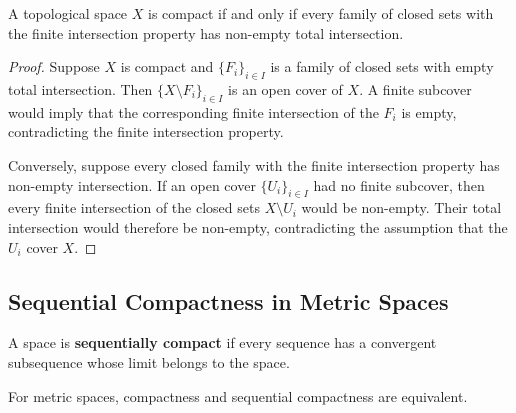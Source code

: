 \begin{theorem}
A topological space $X$ is compact if and only if every family of closed sets with the finite intersection property has non-empty total intersection.
\end{theorem}

\begin{proof}
Suppose $X$ is compact and $\{F_i\}_{i\in I}$ is a family of closed sets with empty total intersection. Then $\{X\setminus F_i\}_{i\in I}$ is an open cover of $X$. A finite subcover would imply that the corresponding finite intersection of the $F_i$ is empty, contradicting the finite intersection property.

Conversely, suppose every closed family with the finite intersection property has non-empty intersection. If an open cover $\{U_i\}_{i\in I}$ had no finite subcover, then every finite intersection of the closed sets $X\setminus U_i$ would be non-empty. Their total intersection would therefore be non-empty, contradicting the assumption that the $U_i$ cover $X$.
\end{proof}

\subsection{Sequential Compactness in Metric Spaces}

\begin{definition}
A space is \textbf{sequentially compact} if every sequence has a convergent subsequence whose limit belongs to the space.
\end{definition}

\begin{theorem}
For metric spaces, compactness and sequential compactness are equivalent.
\end{theorem}

